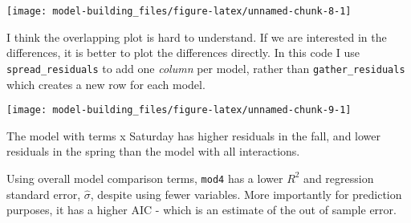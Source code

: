 \documentclass[]{book}
\newenvironment{Shaded}{\begin{snugshade}}{\end{snugshade}}
\newcommand{\CommentTok}[1]{\textcolor[rgb]{0.56,0.35,0.01}{\textit{#1}}}
\newcommand{\DataTypeTok}[1]{\textcolor[rgb]{0.13,0.29,0.53}{#1}}
\newcommand{\FloatTok}[1]{\textcolor[rgb]{0.00,0.00,0.81}{#1}}
\newcommand{\KeywordTok}[1]{\textcolor[rgb]{0.13,0.29,0.53}{\textbf{#1}}}
\newcommand{\NormalTok}[1]{#1}
\newcommand{\OperatorTok}[1]{\textcolor[rgb]{0.81,0.36,0.00}{\textbf{#1}}}
\newcommand{\StringTok}[1]{\textcolor[rgb]{0.31,0.60,0.02}{#1}}
\theoremstyle{plain}
\theoremstyle{remark}
\theoremstyle{definition}
\theoremstyle{definition}
\theoremstyle{definition}
\theoremstyle{remark}
\begin{document}
\begin{center}\texttt{[image: model-building\_files/figure-latex/unnamed-chunk-8-1]} \end{center}

I think the overlapping plot is hard to understand. If we are interested
in the differences, it is better to plot the differences directly. In
this code I use \texttt{spread\_residuals} to add one \emph{column} per
model, rather than \texttt{gather\_residuals} which creates a new row
for each model.

\begin{Shaded}
\end{Shaded}

\begin{center}\texttt{[image: model-building\_files/figure-latex/unnamed-chunk-9-1]} \end{center}

The model with terms x Saturday has higher residuals in the fall, and
lower residuals in the spring than the model with all interactions.

Using overall model comparison terms, \texttt{mod4} has a lower \(R^2\)
and regression standard error, \(\hat\sigma\), despite using fewer
variables. More importantly for prediction purposes, it has a higher AIC
- which is an estimate of the out of sample error.

\begin{Shaded}
\end{Shaded}
\end{document}
